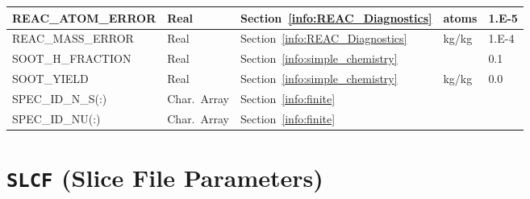 \documentclass[11pt]{book}
\begin{document}
\begin{longtable}{@{\extracolsep{\fill}}|l|l|l|l|l|}
{\ct REAC\_ATOM\_ERROR}                   & Real        & Section~\ref{info:REAC_Diagnostics}       & atoms             & 1.E-5    \\ \hline
{\ct REAC\_MASS\_ERROR}                   & Real        & Section~\ref{info:REAC_Diagnostics}       & kg/kg             & 1.E-4    \\ \hline
{\ct SOOT\_H\_FRACTION}                   & Real        & Section~\ref{info:simple_chemistry}       &                   & 0.1    \\ \hline
{\ct SOOT\_YIELD}                         & Real        & Section~\ref{info:simple_chemistry}       & kg/kg             & 0.0    \\ \hline
{\ct SPEC\_ID\_N\_S(:)}                   & Char.~Array & Section~\ref{info:finite}                   &                   &     \\ \hline
{\ct SPEC\_ID\_NU(:)}                     & Char.~Array & Section~\ref{info:finite}                   &                   &     \\ \hline
\end{longtable}

\vspace{\baselineskip}


\section{\texorpdfstring{{\tt SLCF}}{SLCF} (Slice File Parameters)}
\end{document}
